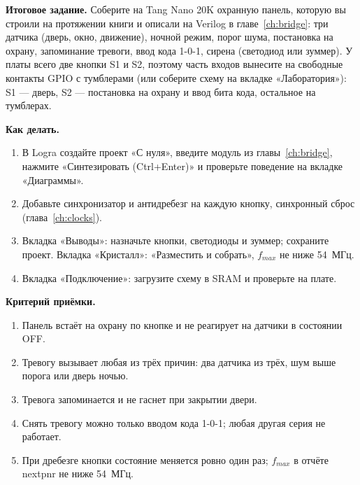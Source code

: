 \begin{taskbox}
\textbf{Итоговое задание.} Соберите на Tang Nano 20K охранную панель, которую вы строили на протяжении книги и описали на Verilog в главе~\ref{ch:bridge}: три датчика (дверь, окно, движение), ночной режим, порог шума, постановка на охрану, запоминание тревоги, ввод кода 1-0-1, сирена (светодиод или зуммер). У платы всего две кнопки S1 и S2, поэтому часть входов вынесите на свободные контакты GPIO с тумблерами (или соберите схему на вкладке «Лаборатория»): S1 --- дверь, S2 --- постановка на охрану и ввод бита кода, остальное на тумблерах.

\textbf{Как делать.}
\begin{enumerate}
  \item В Logra создайте проект «С нуля», введите модуль  из главы~\ref{ch:bridge}, нажмите «Синтезировать (Ctrl+Enter)» и проверьте поведение на вкладке «Диаграммы».
  \item Добавьте синхронизатор и антидребезг на каждую кнопку, синхронный сброс (глава~\ref{ch:clocks}).
  \item Вкладка «Выводы»: назначьте кнопки, светодиоды и зуммер; сохраните проект. Вкладка «Кристалл»: «Разместить и собрать», $f_{max}$ не ниже 54~МГц.
  \item Вкладка «Подключение»: загрузите схему в SRAM и проверьте на плате.
\end{enumerate}

\textbf{Критерий приёмки.}
\begin{enumerate}
  \item Панель встаёт на охрану по кнопке и не реагирует на датчики в состоянии OFF.
  \item Тревогу вызывает любая из трёх причин: два датчика из трёх, шум выше порога или дверь ночью.
  \item Тревога запоминается и не гаснет при закрытии двери.
  \item Снять тревогу можно только вводом кода 1-0-1; любая другая серия не работает.
  \item При дребезге кнопки состояние меняется ровно один раз; $f_{max}$ в отчёте nextpnr не ниже 54~МГц.
\end{enumerate}
\end{taskbox}
